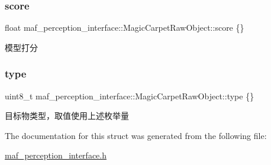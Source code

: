 \subsubsection{\texorpdfstring{score}{score}}
{\footnotesize\ttfamily float maf\+\_\+perception\+\_\+interface\+::\+Magic\+Carpet\+Raw\+Object\+::score \{\}}



模型打分 

\mbox{\label{structmaf__perception__interface_1_1MagicCarpetRawObject_aeee95295ddd7bef4adab5d5007b36500}} 
\subsubsection{\texorpdfstring{type}{type}}
{\footnotesize\ttfamily uint8\+\_\+t maf\+\_\+perception\+\_\+interface\+::\+Magic\+Carpet\+Raw\+Object\+::type \{\}}



目标物类型，取值使用上述枚举量 



The documentation for this struct was generated from the following file\+:\begin{DoxyCompactItemize}
\item 
\hyperlink{maf__perception__interface_8h}{maf\+\_\+perception\+\_\+interface.\+h}\end{DoxyCompactItemize}
